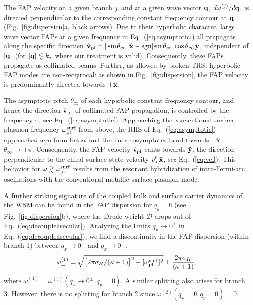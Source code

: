 \documentclass[aps,twocolumn,prl,groupedaddress]{revtex4}
\newcommand{\be}{\begin{equation}}
\newcommand{\ee}{\end{equation}}
\renewcommand{\vec}[1]{{\bf #1}}
\begin{document}
The FAP velocity on a given branch $j$, and at a given wave vector $\vec{q}$, $d\omega^{(j)}/d\vec q$, is directed perpendicular to the corresponding constant frequency contour at $\vec{q}$ (Fig.~\ref{fig:dispersion}a, black arrows). 
Due to their hyperbolic character,
large wave vector FAPs at a given frequency in Eq.~(\ref{eq:asymptotic}) all propagate along the specific direction $\hat{\vec{v}}_{\rm pl} =  |\sin\theta_{\infty}|\, \hat{\vec{x}} - {\rm sgn}[\sin\theta_{\infty}]\cos \theta_\infty\, \hat{\vec{y}}$, independent of $|\vec q|$ (for $|\vec q| \lesssim k_*$ where our treatment is valid).
Consequently, these FAPs propagate as collimated beams. Further, as allowed by broken TRS, hyperbolic FAP modes are non-reciprocal: as shown in Fig.~\ref{fig:dispersion}, the FAP velocity is predominantly directed towards $+\hat{\vec{x}}$. 

The asymptotic pitch $\theta_\infty$ of each hyperbolic constant frequency contour, and hence the direction $\hat{\vec{v}}_{\rm pl}$ of collimated FAP propagation, is controlled by the frequency $\omega$, see Eq.~(\ref{eq:asymptotic}).  Approaching the conventional surface plasmon frequency $\omega^{\rm surf}_{\rm pl}$ from above, the RHS of Eq.~(\ref{eq:asymptotic}) approaches zero from below and the linear asymptotes bend towards $-\hat{\vec{x}}$: $\theta_\infty \to \pm \pi$. 
Consequently, the FAP velocity $\hat{\vec{v}}_{\rm pl}$ cants 
towards $\hat{\vec{y}}$, the direction perpendicular to the chiral surface state velocity $v_s^0\,\hat{\vec{x}}$, see Eq.~(\ref{eq:vel}). 
This 
behavior for $\omega \gtrsim \omega^{\rm surf}_{\rm pl}$ results from the resonant hybridization of 
intra-Fermi-arc oscillations with the conventional metallic surface plasmon mode. 

A further striking signature of the coupled bulk and surface carrier dynamics of the WSM can be found in the FAP dispersion for  $q_y = 0$ (see Fig.~\ref{fig:dispersion}b), 
where the Drude weight $\mathcal{D}$ drops out of Eq.~(\ref{eq:decoupledsecular}). 
Analyzing the limits $q_x \to 0^\pm$ in Eq.~(\ref{eq:decoupledsecular}), we find a 
discontinuity in the FAP dispersion (within branch 1) between $q_x \to 0^+$ and $q_x \to 0^-$:
\be
\omega_\pm^{(1)} = \sqrt{\big[2\pi \sigma_H/(\kappa+1)\big]^2 + [\omega_{\rm pl}^{\rm surf}]^2} \pm \frac{2\pi \sigma_H}{(\kappa+1)},
\label{eq:split}
\ee
where $\omega_\pm^{(1)} = \omega^{(1)} (q_x \to 0^\pm, q_y=0)$. 
A similar splitting also arises for branch 3. 
However, there is no splitting for branch 2 since $\omega^{(2)} (q_x=0, q_y=0) = 0$. 
\end{document}
